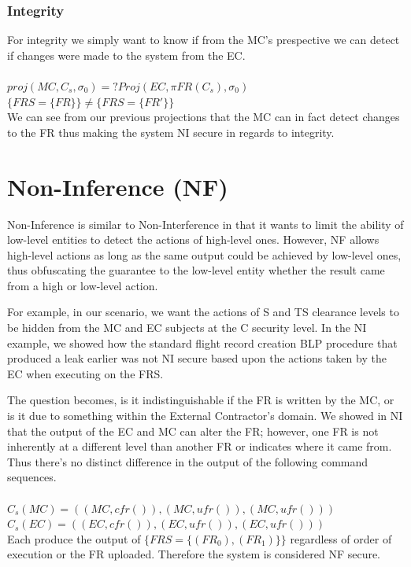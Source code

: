 \documentclass[10pt,journal,compsoc]{IEEEtran}
\begin{document}
\subsubsection{Integrity}

For integrity we simply want to know if from the MC's prespective we can detect if changes were made to the system from the EC. \\\\
$proj(MC, C_s, \sigma_0) =? Proj(EC, \pi FR(C_s), \sigma_0)$\\
$\{FRS = \{FR\}\} \neq \{FRS = \{FR'\}\}$\\

We can see from our previous projections that the MC can in fact detect changes to the FR thus making the system NI secure in regards to integrity. 

\section{Non-Inference (NF)}

Non-Inference is similar to Non-Interference in that it wants to limit the ability of low-level entities to detect the actions of high-level ones. However, NF allows high-level actions as long as the same output could be achieved by low-level ones, thus obfuscating the guarantee to the low-level entity whether the result came from a high or low-level action. 

For example, in our scenario, we want the actions of S and TS clearance levels to be hidden from the MC and EC subjects at the C security level. In the NI example, we showed how the standard flight record creation BLP procedure that produced a leak earlier was not NI secure based upon the actions taken by the EC when executing on the FRS. 

The question becomes, is it indistinguishable if the FR is written by the MC, or is it due to something within the External Contractor's domain. We showed in NI that the output of the EC and MC can alter the FR; however, one FR is not inherently at a different level than another FR or indicates where it came from. Thus there's no distinct difference in the output of the following command sequences.\\\\
$C_s(MC)=((MC, cfr()), (MC, ufr()), (MC, ufr()))$\\
$C_s(EC)=((EC, cfr()), (EC, ufr()), (EC, ufr()))$\\

Each produce the output of $\{FRS = \{(FR_0),(FR_1)\}\}$ regardless of order of execution or the FR uploaded. Therefore the system is considered NF secure. 
\end{document}
